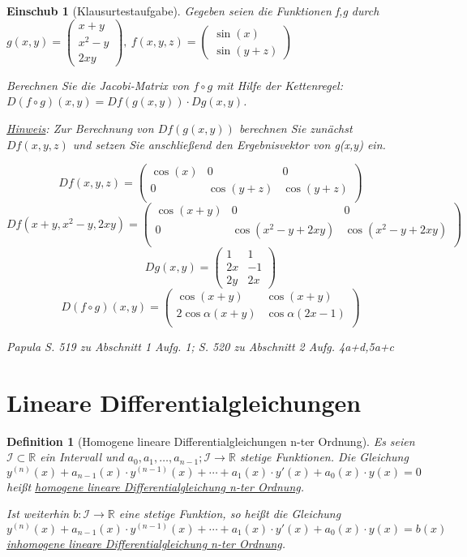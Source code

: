 \documentclass[12pt,a4paper]{scrreprt}
\newtheorem{defi}{Definition}[section]
\newtheorem*{einschub}{Einschub}
\begin{document}
	\begin{einschub}[Klausurtestaufgabe]
		Gegeben seien die Funktionen f,g durch $g(x,y)=\begin{pmatrix}
			x+y \\ x^2-y \\ 2xy
		\end{pmatrix},\ f(x,y,z)=\begin{pmatrix}
			\sin(x) \\ \sin(y+z)
		\end{pmatrix}$

		Berechnen Sie die Jacobi-Matrix von $f\circ g$ mit Hilfe der Kettenregel: $D(f\circ g)(x,y)=Df(g(x,y))\cdot Dg(x,y)$.

		\underline{Hinweis}: Zur Berechnung von $Df(g(x,y))$ berechnen Sie zunächst $Df(x,y,z)$ und setzen Sie anschließend den Ergebnisvektor von g(x,y) ein.

		\[Df(x,y,z)=\begin{pmatrix}
			\cos(x) & 0 & 0 \\
			0 & \cos(y+z) & \cos(y+z) \\\end{pmatrix}\]
		\[Df(x+y,x^2-y,2xy)=\begin{pmatrix}
				\cos(x+y) & 0 & 0 \\
				0 & \cos(x^2-y+2xy) & \cos(x^2-y+2xy) \\\end{pmatrix}\]
		\[Dg(x,y)=\begin{pmatrix}
			1 & 1 \\
			2x & -1 \\
			2y & 2x\end{pmatrix}\]
		\[D(f\circ g)(x,y)=\begin{pmatrix}
			\cos(x+y) & \cos(x+y) \\
			2\cos\alpha(x+y) & \cos\alpha(2x-1) \\
		\end{pmatrix}\]

		Papula S. 519 zu Abschnitt 1 Aufg. 1; S. 520 zu Abschnitt 2 Aufg. 4a+d,5a+c
	\end{einschub}
	\section{Lineare Differentialgleichungen}
	\begin{defi}[Homogene lineare Differentialgleichungen n-ter Ordnung]
		Es seien $\mathcal{I} \subset \mathbb{R}$ ein Intervall und $a_0,a_1,\dots,a_{n-1};\mathcal{I} \to \mathbb{R}$ stetige Funktionen. Die Gleichung
		\[y^{(n)}(x) + a_{n-1}(x) \cdot y^{(n-1)}(x) + \cdots + a_1(x) \cdot y'(x) + a_0(x) \cdot y(x) = 0 \]
		heißt \underline{homogene lineare Differentialgleichung n-ter Ordnung}.

		Ist weiterhin $b:\mathcal{I}\to\mathbb{R}$ eine stetige Funktion, so heißt die Gleichung
		\[y^{(n)}(x) + a_{n-1}(x) \cdot y^{(n-1)}(x) + \cdots + a_1(x) \cdot y'(x) + a_0(x) \cdot y(x) = b(x) \]
		\underline{inhomogene lineare Differentialgleichung n-ter Ordnung}.
	\end{defi}
\end{document}

